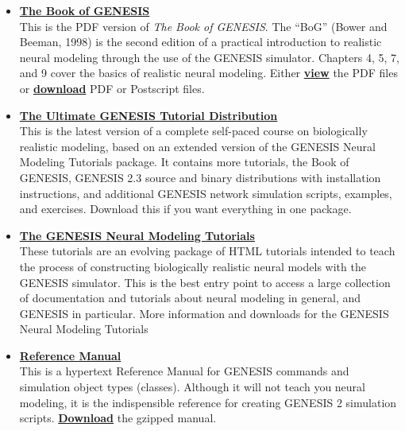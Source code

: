 \documentclass[12pt]{article}
\begin{document}
\begin{itemize}
 
 \item \href{http://www.genesis-sim.org/GENESIS/bog/bog.html}{\bf The Book of GENESIS}\\
 This is the PDF version of {\it The Book of GENESIS}. The ``BoG'' (Bower and Beeman, 1998) is the second edition of a practical introduction to realistic neural modeling through the use of the GENESIS simulator. Chapters 4, 5, 7, and 9 cover the basics of realistic neural modeling.  Either \href{http://www.genesis-sim.org/GENESIS/iBoG/iBoGpdf/index.html}{\bf view} the PDF files or \href{http://www.genesis-sim.org/GENESIS/iBoG/index.html}{\bf download} PDF or Postscript files.

\item \href{http://www.genesis-sim.org/GENESIS/UGTD.html}{\bf The Ultimate GENESIS Tutorial Distribution}\\
This is the latest version of a complete self-paced course on biologically realistic modeling, based on an extended version of the GENESIS Neural Modeling Tutorials package. It contains more tutorials, the Book of GENESIS, GENESIS 2.3 source and binary distributions with installation instructions, and additional GENESIS network simulation scripts, examples, and exercises. Download this if you want everything in one package.

\item \href{http://www.genesis-sim.org/GENESIS/GNMT.html}{\bf The GENESIS Neural Modeling Tutorials}\\
These tutorials are an evolving package of HTML tutorials intended to teach the process of constructing biologically realistic neural models with the GENESIS simulator. This is the best entry point to access a large collection of documentation and tutorials about neural modeling in general, and GENESIS in particular. More information and downloads for the GENESIS Neural Modeling Tutorials

 \item \href{http://www.genesis-sim.org/GENESIS/Hyperdoc/Manual.html}{\bf Reference Manual}\\
This is a hypertext Reference Manual for GENESIS commands and simulation object types (classes). Although it will not teach you neural modeling, it is the indispensible reference for creating GENESIS 2 simulation scripts. \href{http://www.genesis-sim.org/genesis-ftp/}{\bf Download} the gzipped manual.


\end{itemize}
\end{document}
